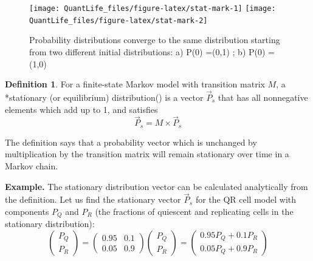 \documentclass[
]{book}
\theoremstyle{definition}
\newtheorem{definition}{Definition}[chapter]
\theoremstyle{definition}
\theoremstyle{definition}
\theoremstyle{remark}
\begin{document}
\begin{figure}

{\centering \texttt{[image: QuantLife\_files/figure-latex/stat-mark-1]} \texttt{[image: QuantLife\_files/figure-latex/stat-mark-2]} 

}

\caption{Probability distributions converge to the same distribution starting from two different initial distributions: a) P(0) =(0,1) ; b) P(0) =(1,0)}\label{fig:stat-mark}
\end{figure}

\begin{definition}
\protect\hypertarget{def:def-mark-stat}{}{\label{def:def-mark-stat} }For a finite-state Markov model with transition matrix \(M\), a *stationary (or equilibrium) distribution() is a vector \(\vec P_s\) that has all nonnegative elements which add up to 1, and satisfies
\[ \vec P_s = M \times  \vec P_s\]
\end{definition}

The definition says that a probability vector which is unchanged by multiplication by the transition matrix will remain stationary over time in a Markov chain. \citep{feller_introduction_????}

\textbf{Example.} The stationary distribution vector can be calculated analytically from the definition. Let us find the stationary vector \(\vec P_s\) for the QR cell model with components \(P_Q\) and \(P_R\) (the fractions of quiescent and replicating cells in the stationary distribution):
\[  \left(\begin{array}{c} P_Q  \\ P_R \end{array} \right) =\left(\begin{array}{cc}0.95 & 0.1 \\0.05 & 0.9\end{array}\right)  \left(\begin{array}{c} P_Q  \\ P_R \end{array}\right) =  \left(\begin{array}{c}0.95P_Q + 0.1P_R \\0.05P_Q + 0.9P_R \end{array}\right) \]
\end{document}
